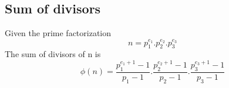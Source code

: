 \subsection{Sum of divisors}
Given the prime factorization $$ n = p_1^{e_1} . p_2^{e_2} . p_3^{e_3} $$
The sum of divisors of n is
$$ \phi(n) = \dfrac{p_1^{e_1 + 1} - 1}{p_1 - 1} . \dfrac{p_2^{e_2 + 1} - 1}{p_2 - 1} . \dfrac{p_3^{e_3 + 1} - 1}{p_3 - 1}  $$
